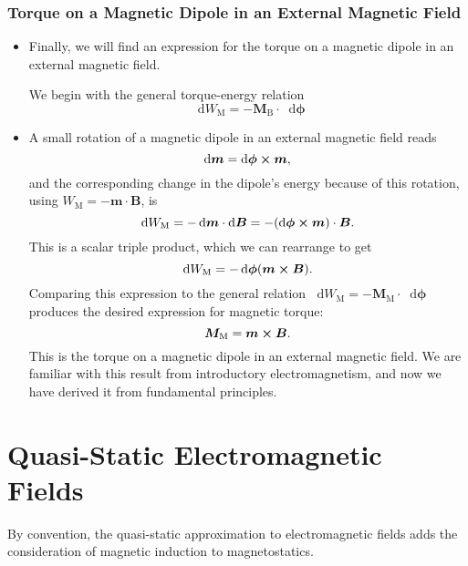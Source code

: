 \documentclass[11pt, a4paper]{article}
\newcommand{\diff}{\mathop{}\!\mathrm{d}} %
\renewcommand{\vec}[1]{\bm{#1}} %
\newcommand{\B}{\vec{B}} %
\newcommand{\m}{\vec{m}}  %
\begin{document}
\subsubsection{Torque on a Magnetic Dipole in an External Magnetic Field}
\begin{itemize}
	\item Finally, we will find an expression for the torque on a magnetic dipole in an external magnetic field. 

    We begin with the general torque-energy relation
	\begin{equation*}
		\diff W_{\text{M}} = - \vec{M}_{\text{B}}\cdot \diff \vec{\phi}
	\end{equation*}
	
	\item A small rotation of a magnetic dipole in an external magnetic field reads
	\begin{equation*}
		\diff \vec{m} = \diff \vec{\phi} \cross \m,
	\end{equation*}
	and the corresponding change in the dipole's energy because of this rotation, using $ W_{\text{M}} = - \m \cdot \B $, is
	\begin{equation*}
		\diff W_{\text{M}} = - \diff \m \cdot \diff \B = - (\diff \vec{\phi} \cross \m)\cdot \B.
	\end{equation*}
	This is a scalar triple product, which we can rearrange to get
	\begin{equation*}
		\diff W_{\text{M}} = - \diff \vec{\phi}(\m \cross \B).
	\end{equation*}
	Comparing this expression to the general relation $ \diff W_{\text{M}} = - \vec{M}_{\text{M}}\cdot \diff \vec{\phi} $ produces the desired expression for magnetic torque:
	\begin{equation*}
		\vec{M}_{\text{M}} = \m \cross \B.
	\end{equation*}
	This is the torque on a magnetic dipole in an external magnetic field. We are familiar with this result from introductory electromagnetism, and now we have derived it from fundamental principles.
\end{itemize}

\newpage
\section{Quasi-Static Electromagnetic Fields}
By convention, the quasi-static approximation to electromagnetic fields adds the consideration of magnetic induction to magnetostatics. 
\end{document}
